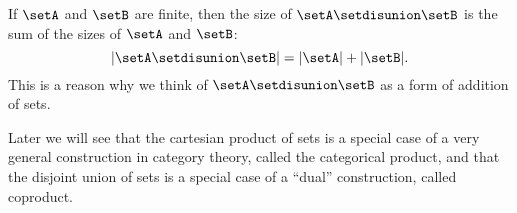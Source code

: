 \begin{remark}
    If $\setA$ and $\setB$ are finite, then the size of $\setA \setdisunion \setB$ is the sum of the sizes of $\setA$ and $\setB$:
    \begin{equation}
        \vert \setA \setdisunion \setB \vert = \vert \setA \vert + \vert \setB \vert.
    \end{equation}
    This is a reason why we think of $\setA \setdisunion \setB$ as a form of addition of sets.
\end{remark}

\begin{remark}
    Later we will see that the cartesian product of sets is a special case of a very general construction in category theory, called the categorical product, and that the disjoint union of sets is a special case of a ``dual'' construction, called coproduct.
\end{remark}

